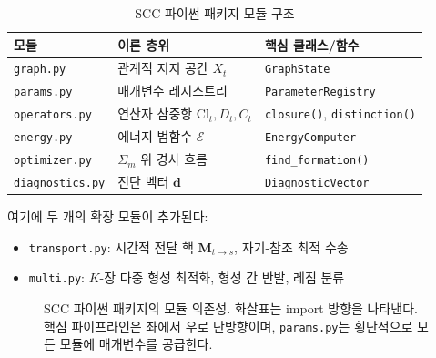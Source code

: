 \begin{table}[h]
\centering
\caption{SCC 파이썬 패키지 모듈 구조}
\label{tab:modules}
\begin{tabular}{lll}
\toprule
\textbf{모듈} & \textbf{이론 층위} & \textbf{핵심 클래스/함수} \\
\midrule
\texttt{graph.py} & 관계적 지지 공간 $X_t$ & \texttt{GraphState} \\
\texttt{params.py} & 매개변수 레지스트리 & \texttt{ParameterRegistry} \\
\texttt{operators.py} & 연산자 삼중항 $\mathrm{Cl}_t, D_t, C_t$ & \texttt{closure()}, \texttt{distinction()} \\
\texttt{energy.py} & 에너지 범함수 $\mathcal{E}$ & \texttt{EnergyComputer} \\
\texttt{optimizer.py} & $\Sigma_m$ 위 경사 흐름 & \texttt{find\_formation()} \\
\texttt{diagnostics.py} & 진단 벡터 $\mathbf{d}$ & \texttt{DiagnosticVector} \\
\bottomrule
\end{tabular}
\end{table}

여기에 두 개의 확장 모듈이 추가된다:
\begin{itemize}
    \item \texttt{transport.py}: 시간적 전달 핵 $\mathbf{M}_{t \to s}$, 자기-참조 최적 수송
    \item \texttt{multi.py}: $K$-장 다중 형성 최적화, 형성 간 반발, 레짐 분류
\end{itemize}

\begin{figure}[t]
\centering
\caption{SCC 파이썬 패키지의 모듈 의존성. 화살표는 import 방향을 나타낸다. 핵심 파이프라인은 좌에서 우로 단방향이며, \texttt{params.py}는 횡단적으로 모든 모듈에 매개변수를 공급한다.}
\label{fig:module-deps}
\end{figure}

